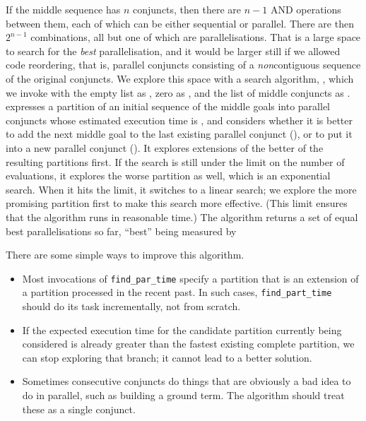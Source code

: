 If the middle sequence has $n$ conjuncts,
then there are $n-1$ AND operations between them,
each of which can be either sequential or parallel.
There are then $2^{n-1}$ combinations,
all but one of which are parallelisations.
That is a large space to search for the \emph{best} parallelisation,
and it would be larger still if we allowed code reordering,
that is, parallel conjuncts consisting of
a \emph{non}contiguous sequence of the original conjuncts.
We explore this space with a search algorithm,
, which
we invoke with the empty list as ,
zero as , and the list of middle conjuncts as .
 expresses a partition of an initial sequence
of the middle goals into parallel conjuncts
whose estimated execution time is ,
and considers whether it is better to add the next middle goal
to the last existing parallel conjunct (),
or to put it into a new parallel conjunct ().
It explores extensions of the better of the resulting partitions first.
If the search is still under the limit on the number of evaluations,
it explores the worse partition as well,
which is an exponential search.
When it hits the limit,
it switches to a linear search;
we explore the more promising partition first
to make this search more effective.
(This limit ensures that the algorithm runs in reasonable time.)
The algorithm returns a set of equal best parallelisations so far,
``best'' being measured by

There are some simple ways to improve this algorithm.
\begin{itemize}
\item
Most invocations of \verb|find_par_time| specify a partition
that is an extension of a partition processed in the recent past.
In such cases, \verb|find_part_time| should do its task
incrementally, not from scratch.
\item
If the expected execution time
for the candidate partition currently being considered
is already greater than the fastest existing complete partition,
we can stop exploring that branch;
it cannot lead to a better solution.
\item
Sometimes consecutive conjuncts do things that are
obviously a bad idea to do in parallel, such as building a ground term.
The algorithm should treat these as a single conjunct.
\end{itemize}

